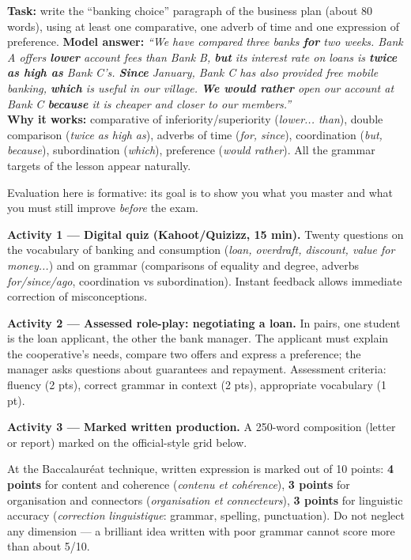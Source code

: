 \documentclass[11pt]{article}
\newcommand{\cle}[1]{{\popxbold\color{popdark}#1}}
\newcounter{popsec}
\newcounter{popsub}
\newcommand{\courssub}[1]{%
  \stepcounter{popsub}%
  \par\vspace{9pt}\noindent{\popxbold\fontsize{11.5}{13}\selectfont\color{popink}{\color{poporange}\thepopsec.\thepopsub}\hspace{6pt}#1}\par\nopagebreak\vspace{4pt}
}
\begin{document}
\begin{exoresolu}
\textbf{Task:} write the ``banking choice'' paragraph of the business plan (about 80 words), using at least one comparative, one adverb of time and one expression of preference.
\tcblower
\textbf{Model answer:} \emph{``We have compared three banks \textbf{for} two weeks. Bank A offers \textbf{lower} account fees than Bank B, \textbf{but} its interest rate on loans is \textbf{twice as high as} Bank C's. \textbf{Since} January, Bank C has also provided free mobile banking, \textbf{which} is useful in our village. \textbf{We would rather} open our account at Bank C \textbf{because} it is cheaper and closer to our members.''}\\
\textbf{Why it works:} comparative of inferiority/superiority (\emph{lower... than}), double comparison (\emph{twice as high as}), adverbs of time (\emph{for, since}), coordination (\emph{but, because}), subordination (\emph{which}), preference (\emph{would rather}). All the grammar targets of the lesson appear naturally.
\end{exoresolu}

\courssub{Formative Evaluation}

Evaluation here is \cle{formative}: its goal is to show you what you master and what you must still improve \emph{before} the exam.

\textbf{Activity 1 — Digital quiz (Kahoot/Quizizz, 15 min).} Twenty questions on the vocabulary of banking and consumption (\emph{loan, overdraft, discount, value for money...}) and on grammar (comparisons of equality and degree, adverbs \emph{for/since/ago}, coordination vs subordination). Instant feedback allows immediate correction of misconceptions.

\textbf{Activity 2 — Assessed role-play: negotiating a loan.} In pairs, one student is the \cle{loan applicant}, the other the \cle{bank manager}. The applicant must explain the cooperative's needs, compare two offers and express a preference; the manager asks questions about guarantees and repayment. Assessment criteria: fluency (2 pts), correct grammar in context (2 pts), appropriate vocabulary (1 pt).

\textbf{Activity 3 — Marked written production.} A 250-word composition (letter or report) marked on the official-style grid below.

\begin{attention}
At the Baccalauréat technique, written expression is marked out of 10 points: \textbf{4 points} for content and coherence (\emph{contenu et cohérence}), \textbf{3 points} for organisation and connectors (\emph{organisation et connecteurs}), \textbf{3 points} for linguistic accuracy (\emph{correction linguistique}: grammar, spelling, punctuation). Do not neglect any dimension — a brilliant idea written with poor grammar cannot score more than about 5/10.
\end{attention}
\end{document}
